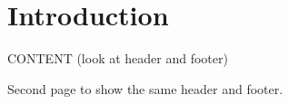 \documentclass{header-footer}
\begin{document}

\section*{Introduction}
CONTENT
(look at header and footer)

\newpage
Second page to show the same header and footer.
\end{document}
